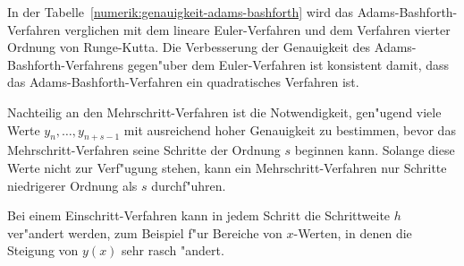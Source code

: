 In der Tabelle~\ref{numerik:genauigkeit-adams-bashforth} wird
das Adams-Bashforth-Verfahren verglichen mit dem lineare Euler-Verfahren 
und dem Verfahren vierter Ordnung von Runge-Kutta.
Die Verbesserung der Genauigkeit des Adams-Bashforth-Verfahrens
gegen"uber dem Euler-Ver\-fah\-ren ist konsistent damit, dass
das Adams-Bashforth-Verfahren ein quadratisches Verfahren ist.

Nachteilig an den Mehrschritt-Verfahren ist die Notwendigkeit,
gen"ugend viele Werte $y_{n},\dots,y_{n+s-1}$ mit ausreichend
hoher Genauigkeit zu bestimmen, bevor das Mehrschritt-Verfahren
seine Schritte der Ordnung $s$ beginnen kann.
Solange diese Werte nicht zur Verf"ugung stehen, kann ein Mehrschritt-Verfahren
nur Schritte niedrigerer Ordnung als $s$ durchf"uhren.

Bei einem Einschritt-Verfahren kann in jedem Schritt die Schrittweite $h$
ver"andert werden, zum Beispiel f"ur Bereiche von $x$-Werten, in denen
die Steigung von $y(x)$ sehr rasch "andert.


